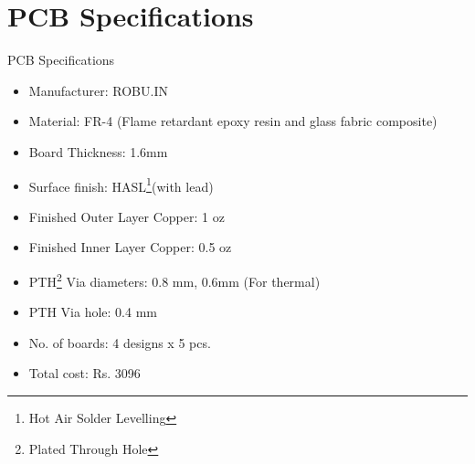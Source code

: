 \documentclass[aspectratio=169]{beamer}
\begin{document}
	\section{PCB Specifications}	
				\begin{frame}{PCB Specifications}
			\begin{itemize}
				\item Manufacturer: ROBU.IN
				\item Material: FR-4 (Flame retardant epoxy resin and glass fabric composite)
				\item Board Thickness: 1.6mm
				\item Surface finish: HASL{\footnote{Hot Air Solder Levelling}}(with lead)
				\item Finished Outer Layer Copper: 1 oz
				\item Finished Inner Layer Copper: 0.5 oz
				\item PTH{\footnote{Plated Through Hole}} Via diameters: 0.8 mm, 0.6mm (For thermal)	
				\item PTH Via hole: 0.4 mm
				\item No. of boards: 4 designs x 5 pcs.
				\item Total cost: Rs. 3096
			\end{itemize}
		\end{frame}
			
\end{document}
